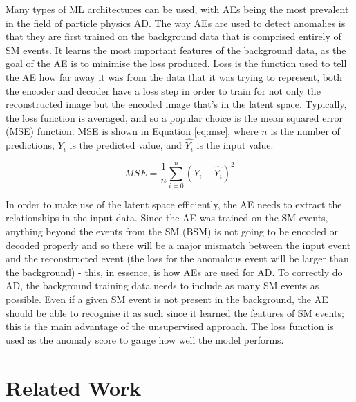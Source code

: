 \documentclass[a4paper]{article}
\theoremstyle{plain}
\theoremstyle{definition}
\begin{document}
	Many types of ML architectures can be used, with AEs \cite{autoencoders} being the most prevalent in the field of particle physics AD. The way AEs are used to detect anomalies is that they are first trained on the background data that is comprised entirely of SM events. It learns the most important features of the background data, as the goal of the AE is to minimise the loss produced. Loss is the function used to tell the AE how far away it was from the data that it was trying to represent, both the encoder and decoder have a loss step in order to train for not only the reconstructed image but the encoded image that's in the latent space. Typically, the loss function is averaged, and so a popular choice is the mean squared error (MSE) function. MSE is shown in Equation \ref{eq:mse}, where $n$ is the number of predictions, $Y_i$ is the predicted value, and $\hat{Y_i}$ is the input value.
	
	\begin{equation}\label{eq:mse}
			MSE =  \frac{1}{n} \sum_{i=0}^{n} (Y_i - \hat{Y_i})^2
	\end{equation}
	
	In order to make use of the latent space efficiently, the AE needs to extract the relationships in the input data. Since the AE was trained on the SM events, anything beyond the events from the SM (BSM) is not going to be encoded or decoded properly and so there will be a major mismatch between the input event and the reconstructed event (the loss for the anomalous event will be larger than the background) - this, in essence, is how AEs are used for AD. To correctly do AD, the background training data needs to include as many SM events as possible. Even if a given SM event is not present in the background, the AE should be able to recognise it as such since it learned the features of SM events; this is the main advantage of the unsupervised approach. The loss function is used as the anomaly score to gauge how well the model performs. 


	\section{Related Work}
	\label{sec:related-works}
	
\end{document}
